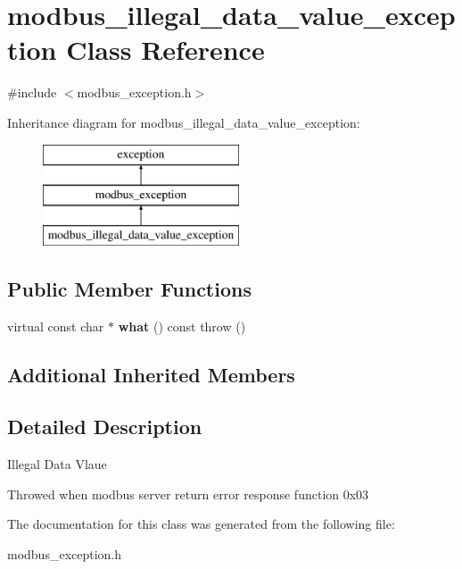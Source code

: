 \hypertarget{classmodbus__illegal__data__value__exception}{}\section{modbus\+\_\+illegal\+\_\+data\+\_\+value\+\_\+exception Class Reference}
\label{classmodbus__illegal__data__value__exception}


{\ttfamily \#include $<$modbus\+\_\+exception.\+h$>$}

Inheritance diagram for modbus\+\_\+illegal\+\_\+data\+\_\+value\+\_\+exception\+:\begin{figure}[H]
\begin{center}
\leavevmode
\includegraphics[height=3.000000cm]{classmodbus__illegal__data__value__exception}
\end{center}
\end{figure}
\subsection*{Public Member Functions}
\begin{DoxyCompactItemize}
\item 
\mbox{\label{classmodbus__illegal__data__value__exception_a3cc9b8945a9f36c74427692b135f981b}} 
virtual const char $\ast$ {\bfseries what} () const  throw ()
\end{DoxyCompactItemize}
\subsection*{Additional Inherited Members}


\subsection{Detailed Description}
Illegal Data Vlaue

Throwed when modbus server return error response function 0x03 

The documentation for this class was generated from the following file\+:\begin{DoxyCompactItemize}
\item 
modbus\+\_\+exception.\+h\end{DoxyCompactItemize}

